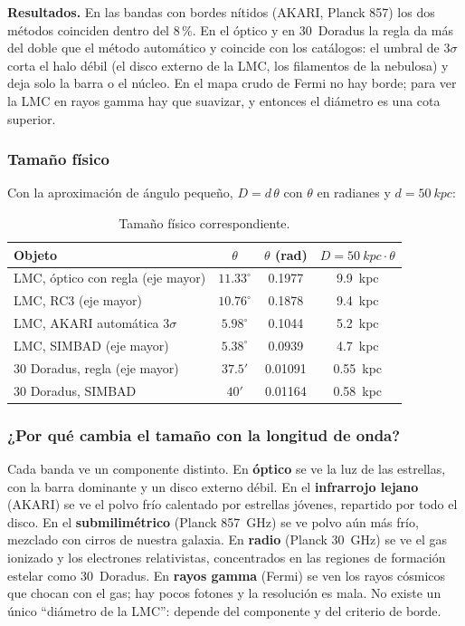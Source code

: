 \documentclass[11pt,a4paper]{article}
\begin{document}
\textbf{Resultados.} En las bandas con bordes nítidos (AKARI, Planck 857) los dos métodos coinciden
dentro del 8\,\%. En el óptico y en 30~Doradus la regla da más del doble que el método automático y
coincide con los catálogos: el umbral de $3\sigma$ corta el halo débil (el disco externo de la LMC, los
filamentos de la nebulosa) y deja solo la barra o el núcleo. En el mapa crudo de Fermi no hay borde;
para ver la LMC en rayos gamma hay que suavizar, y entonces el diámetro es una cota superior.

\subsubsection{Tamaño físico}
Con la aproximación de ángulo pequeño, $D = d\,\theta$ con $\theta$ en radianes y $d = \SI{50}{kpc}$:
\begin{table}[H]
\centering
\caption{Tamaño físico correspondiente.}
\begin{tabular}{lccc}
\toprule
Objeto & $\theta$ & $\theta$ (rad) & $D = \SI{50}{kpc}\cdot\theta$ \\
\midrule
LMC, óptico con regla (eje mayor) & $11.33^\circ$ & 0.1977 & \SI{9.9}{kpc} \\
LMC, RC3 (eje mayor) & $10.76^\circ$ & 0.1878 & \SI{9.4}{kpc} \\
LMC, AKARI automática $3\sigma$ & $5.98^\circ$ & 0.1044 & \SI{5.2}{kpc} \\
LMC, SIMBAD (eje mayor) & $5.38^\circ$ & 0.0939 & \SI{4.7}{kpc} \\
30 Doradus, regla (eje mayor) & $37.5'$ & 0.01091 & \SI{0.55}{kpc} \\
30 Doradus, SIMBAD & $40'$ & 0.01164 & \SI{0.58}{kpc} \\
\bottomrule
\end{tabular}
\end{table}

\subsubsection{¿Por qué cambia el tamaño con la longitud de onda?}
Cada banda ve un componente distinto. En \textbf{óptico} se ve la luz de las estrellas, con la barra
dominante y un disco externo débil. En el \textbf{infrarrojo lejano} (AKARI) se ve el polvo frío
calentado por estrellas jóvenes, repartido por todo el disco. En el \textbf{submilimétrico} (Planck
\SI{857}{GHz}) se ve polvo aún más frío, mezclado con cirros de nuestra galaxia. En \textbf{radio}
(Planck \SI{30}{GHz}) se ve el gas ionizado y los electrones relativistas, concentrados en las regiones
de formación estelar como 30~Doradus. En \textbf{rayos gamma} (Fermi) se ven los rayos cósmicos que
chocan con el gas; hay pocos fotones y la resolución es mala. No existe un único ``diámetro de la
LMC'': depende del componente y del criterio de borde.
\end{document}
